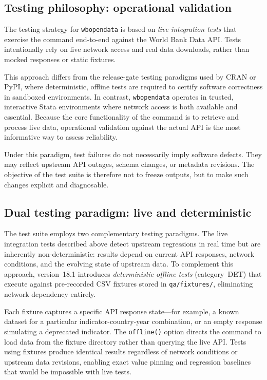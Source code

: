 \documentclass[bib]{statapress}
\begin{document}
\subsection{Testing philosophy: operational validation}

The testing strategy for \texttt{wbopendata} is based on \emph{live integration
tests} that exercise the command end-to-end against the World Bank Data API.
Tests intentionally rely on live network access and real data downloads, rather
than mocked responses or static fixtures.

This approach differs from the release-gate testing paradigms used by CRAN or
PyPI, where deterministic, offline tests are required to certify software
correctness in sandboxed environments. In contrast, \texttt{wbopendata} operates
in trusted, interactive Stata environments where network access is both
available and essential. Because the core functionality of the command is to
retrieve and process live data, operational validation against the actual API
is the most informative way to assess reliability.

Under this paradigm, test failures do not necessarily imply software defects.
They may reflect upstream API outages, schema changes, or metadata revisions.
The objective of the test suite is therefore not to freeze outputs, but to make
such changes explicit and diagnosable.

\subsection{Dual testing paradigm: live and deterministic}

The test suite employs two complementary testing paradigms. The live
integration tests described above detect upstream regressions in real time but
are inherently non-deterministic: results depend on current API responses,
network conditions, and the evolving state of upstream data.  To complement
this approach, version~18.1 introduces \emph{deterministic offline tests}
(category~DET) that execute against pre-recorded CSV fixtures stored in
\texttt{qa/fixtures/}, eliminating network dependency entirely.

Each fixture captures a specific API response state---for example, a known
dataset for a particular indicator-country-year combination, or an empty
response simulating a deprecated indicator.  The \texttt{offline()} option
directs the command to load data from the fixture directory rather than
querying the live API.  Tests using fixtures produce identical results
regardless of network conditions or upstream data revisions, enabling exact
value pinning and regression baselines that would be impossible with live
tests.
\end{document}

